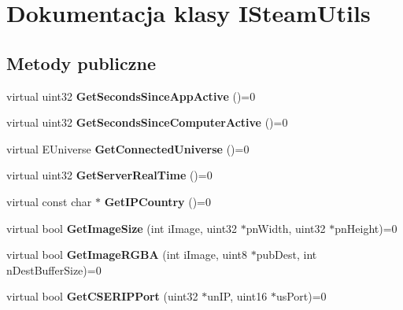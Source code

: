 \hypertarget{class_i_steam_utils}{}\section{Dokumentacja klasy I\+Steam\+Utils}
\label{class_i_steam_utils}
\subsection*{Metody publiczne}
\begin{DoxyCompactItemize}
\item 
\mbox{\label{class_i_steam_utils_afd6e42591223d603ee36b3614fe8f87c}} 
virtual uint32 {\bfseries Get\+Seconds\+Since\+App\+Active} ()=0
\item 
\mbox{\label{class_i_steam_utils_a146505b28989619a292d5e6405f86abe}} 
virtual uint32 {\bfseries Get\+Seconds\+Since\+Computer\+Active} ()=0
\item 
\mbox{\label{class_i_steam_utils_ab43bc9b258f3742cb5d09660d7cf7446}} 
virtual E\+Universe {\bfseries Get\+Connected\+Universe} ()=0
\item 
\mbox{\label{class_i_steam_utils_a0002cdef3d913b0ab024d023e3cef831}} 
virtual uint32 {\bfseries Get\+Server\+Real\+Time} ()=0
\item 
\mbox{\label{class_i_steam_utils_adfec6d1673d1f893ac04995f566b139e}} 
virtual const char $\ast$ {\bfseries Get\+I\+P\+Country} ()=0
\item 
\mbox{\label{class_i_steam_utils_a831105a543f93c49c152a80b30078099}} 
virtual bool {\bfseries Get\+Image\+Size} (int i\+Image, uint32 $\ast$pn\+Width, uint32 $\ast$pn\+Height)=0
\item 
\mbox{\label{class_i_steam_utils_a097977ac0c242380be19d5e91676f219}} 
virtual bool {\bfseries Get\+Image\+R\+G\+BA} (int i\+Image, uint8 $\ast$pub\+Dest, int n\+Dest\+Buffer\+Size)=0
\item 
\mbox{\label{class_i_steam_utils_a448aef5550d6d1983404e09f4e81a72e}} 
virtual bool {\bfseries Get\+C\+S\+E\+R\+I\+P\+Port} (uint32 $\ast$un\+IP, uint16 $\ast$us\+Port)=0

\end{DoxyCompactItemize}
